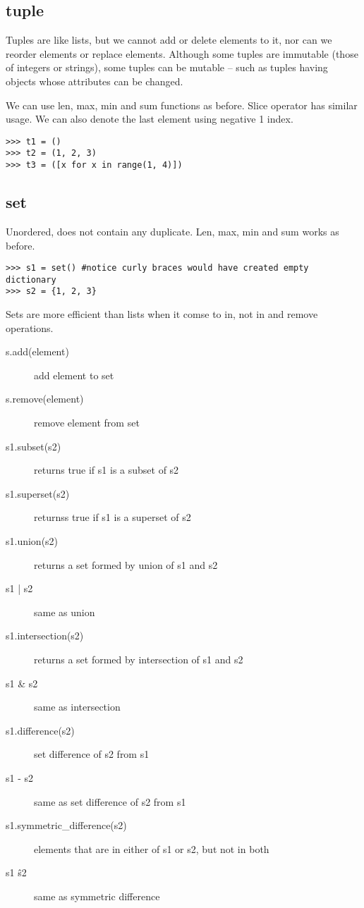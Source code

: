 \documentclass[a4paper, 12pt]{article}
\begin{document}
\subsection{tuple}
Tuples are like lists, but we cannot add or delete elements to it, nor can we reorder elements or replace elements. Although some tuples are immutable (those of integers or strings), some tuples can be mutable -- such as tuples having objects whose attributes can be changed.

We can use len, max, min and sum functions as before. Slice operator has similar usage. We can also denote the last element using negative 1 index.
\begin{verbatim}
>>> t1 = ()
>>> t2 = (1, 2, 3)
>>> t3 = ([x for x in range(1, 4)])
\end{verbatim}

\subsection{set}
Unordered, does not contain any duplicate. Len, max, min and sum works as before.

\begin{verbatim}
>>> s1 = set() #notice curly braces would have created empty dictionary
>>> s2 = {1, 2, 3}
\end{verbatim}

Sets are more efficient than lists when it comse to in, not in and remove operations.
\begin{description}
\item[s.add(element)] add element to set
\item[s.remove(element)] remove element from set
\item[s1.subset(s2)] returns true if s1 is a subset of s2
\item[s1.superset(s2)] returnss true if s1 is a superset of s2
\item[s1.union(s2)] returns a set formed by union of s1 and s2
\item[s1 | s2] same as union
\item[s1.intersection(s2)] returns a set formed by intersection of s1 and s2
\item[s1 \& s2] same as intersection
\item[s1.difference(s2)] set difference of s2 from s1
\item[s1 - s2] same as set difference of s2 from s1
\item[s1.symmetric\_difference(s2)] elements that are in either of s1 or s2, but not in both
\item[s1 \^ s2] same as symmetric difference
\end{description}
\end{document}
